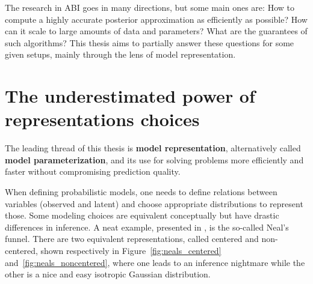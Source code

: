 The research in \ac{ABI} goes in many directions, but some main ones are: How to compute a highly accurate posterior approximation as efficiently as possible? How can it scale to large amounts of data and parameters? What are the guarantees of such algorithms?
This thesis aims to partially answer these questions for some given setups, mainly through the lens of model representation.

\section{The underestimated power of representations choices}

The leading thread of this thesis is \textbf{model representation}, alternatively called \textbf{model parameterization}, and its use for solving problems more efficiently and faster without compromising prediction quality.

When defining probabilistic models, one needs to define relations between variables (observed and latent) and choose appropriate distributions to represent those.
Some modeling choices are equivalent conceptually but have drastic differences in inference.
A neat example, presented in \citet{gorinovaAutomaticReparameterisationProbabilistic2020}, is the so-called Neal's funnel.
There are two equivalent representations, called centered and non-centered, shown respectively in Figure~\ref{fig:neals_centered} and~\ref{fig:neals_noncentered}, where one leads to an inference nightmare while the other is a nice and easy isotropic Gaussian distribution.

